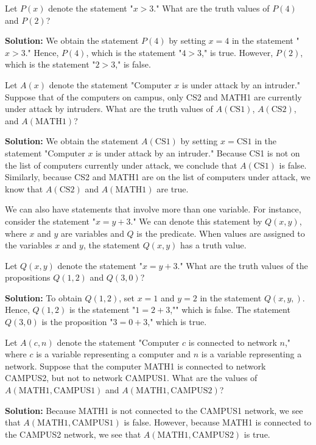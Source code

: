 \documentclass{Axon}
\begin{document}
\begin{example}\label{Example: 1}
    Let \(P(x)\) denote the statement "\(x > 3\)." What are the truth values of \(P(4)\) and \(P(2)\)?

    \noindent
    \textbf{Solution:}
    We obtain the statement \(P(4)\) by setting \(x = 4\) in the statement "\(x > 3\)." Hence, \(P(4)\), which is the statement "\(4 > 3\)," is true. However, \(P(2)\), which is the statement "\(2 > 3\)," is false.
\end{example}

\begin{example}\label{Example: 2}
    Let \(A(x)\) denote the statement "Computer \(x\) is under attack by an intruder." Suppose that of the computers on campus, only CS2 and MATH1 are currently under attack by intruders. What are the truth values of \(A(\text{CS1})\), \(A(\text{CS2})\), and \(A(\text{MATH1})\)?

    \noindent
    \textbf{Solution:}
    We obtain the statement \(A(\text{CS1})\) by setting \(x = \text{CS1}\) in the statement "Computer \(x\) is under attack by an intruder." Because CS1 is not on the list of computers currently under attack, we conclude that \(A(\text{CS1})\) is false. Similarly, because CS2 and MATH1 are on the list of computers under attack, we know that \(A(\text{CS2})\) and \(A(\text{MATH1})\) are true.
\end{example}

We can also have statements that involve more than one variable. For instance, consider the statement "\(x = y + 3\)." We can denote this statement by \(Q(x, y)\), where \(x\) and \(y\) are variables and \(Q\) is the predicate. When values are assigned to the variables \(x\) and \(y\), the statement \(Q(x, y)\) has a truth value.

\begin{example}
    Let \(Q(x, y)\) denote the statement "\(x = y + 3\)." What are the truth values of the propositions \(Q(1, 2)\) and \(Q(3, 0)\)?

    \noindent
    \textbf{Solution:}
    To obtain \(Q(1, 2)\), set \(x = 1\) and \(y = 2\) in the statement \(Q(x, y,)\). Hence, \(Q(1, 2)\) is the statement "\(1 = 2 + 3\),"" which is false. The statement \(Q(3, 0)\) is the proposition "\(3 = 0 + 3\)," which is true.
\end{example}

\begin{example}
    Let \(A(c, n)\) denote the statement "Computer \(c\) is connected to network \(n\)," where \(c\) is a variable representing a computer and \(n\) is a variable representing a network. Suppose that the computer MATH1 is connected to network CAMPUS2, but not to network CAMPUS1. What are the values of \(A(\text{MATH1}, \text{CAMPUS1})\) and \(A(\text{MATH1}, \text{CAMPUS2})\)?

    \noindent
    \textbf{Solution:}
    Because MATH1 is not connected to the CAMPUS1 network, we see that \(A(\text{MATH1}, \text{CAMPUS1})\) is false. However, because MATH1 is connected to the CAMPUS2 network, we see that \(A(\text{MATH1}, \text{CAMPUS2})\) is true.
\end{example}
\end{document}
